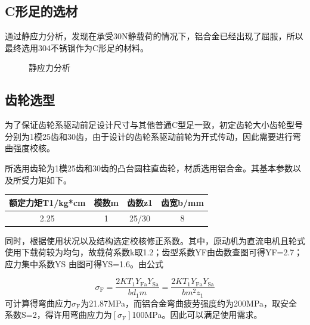 \documentclass[12pt]{article}
\begin{document}
\begin{CJK}{UTF8}{song}
\subsection{C形足的选材}
通过静应力分析，发现在承受30N静载荷的情况下，铝合金已经出现了屈服，所以最终选用304不锈钢作为C形足的材料。
\begin{figure}[H]
{}
\quad
{}
\caption{静应力分析}
\end{figure}

\subsection{齿轮选型}
为了保证齿轮系驱动前足设计尺寸与其他普通C型足一致，初定齿轮大小齿轮型号分别为1模25齿和30齿，由于设计的齿轮系驱动前轮为开式传动，因此需要进行弯曲强度校核。\par
所选用齿轮为1模25齿和30齿的凸台圆柱直齿轮，材质选用铝合金。其基本参数以及所受力矩如下。\par
\begin{table}[!htbp]
\centering
\begin{tabular}{|c|c|c|c|} %
\hline %
额定力矩T1/kg*cm&模数m&齿数z1&齿宽b/mm\\
\hline
2.25&1&25/30&8\\
\hline
\end{tabular}
\end{table}
同时，根据使用状况以及结构选定校核修正系数。其中，原动机为直流电机且轮式使用下载荷较为均匀，故载荷系数k取1.2；齿型系数YF由齿数查图可得YF=2.7；应力集中系数YS
由图可得YS=1.6。由公式\par
$$\sigma _ { \mathrm { F } } = \frac { 2 K T _ { 1 } Y _ { \mathrm { Fa } } Y _ { \mathrm { Sa } } } { b d _ { 1 } m } = \frac { 2 K T _ { 1 } Y _ { \mathrm { Fa } } Y _ { \mathrm { Sa } } } { b m ^ { 2 } z _ { 1 } } $$
可计算得弯曲应力$\sigma _ { \mathrm { F } } $为21.87MPa，而铝合金弯曲疲劳强度约为200MPa，取安全系数S=2，得许用弯曲应力为$\left[ \sigma _ { \mathrm { F } } \right]$100MPa。因此可以满足使用需求。


\end{CJK}
\end{document}
